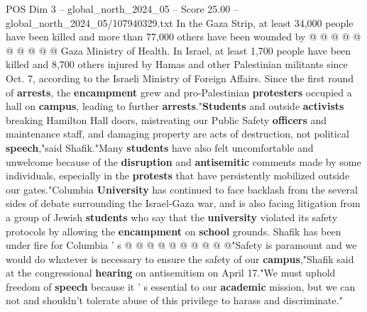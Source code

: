 \begin{textsample}{POS Dim 3 – global\_north\_2024\_05 – Score 25.00 – global\_north\_2024\_05/107940329.txt}
In the Gaza Strip, at least 34,000 people have been killed and more than 77,000 others have been wounded by @ @ @ @ @ @ @ @ @ @ Gaza Ministry of Health.
In Israel, at least 1,700 people have been killed and 8,700 others injured by Hamas and other Palestinian militants since Oct. 7, according to the Israeli Ministry of Foreign Affairs.
Since the first round of \textbf{arrests}, the \textbf{encampment} grew and pro-Palestinian \textbf{protesters} occupied a hall on \textbf{campus}, leading to further \textbf{arrests}."\textbf{Students} and outside \textbf{activists} breaking Hamilton Hall doors, mistreating our Public Safety \textbf{officers} and maintenance staff, and damaging property are acts of destruction, not political \textbf{speech},"said Shafik."Many \textbf{students} have also felt uncomfortable and unwelcome because of the \textbf{disruption} and \textbf{antisemitic} comments made by some individuals, especially in the \textbf{protests} that have persistently mobilized outside our gates."Columbia \textbf{University} has continued to face backlash from the several sides of debate surrounding the Israel-Gaza war, and is also facing litigation from a group of Jewish \textbf{students} who say that the \textbf{university} violated its safety protocols by allowing the \textbf{encampment} on \textbf{school} grounds.
Shafik has been under fire for Columbia ' s @ @ @ @ @ @ @ @ @ @"Safety is paramount and we would do whatever is necessary to ensure the safety of our \textbf{campus},"Shafik said at the congressional \textbf{hearing} on antisemitism on April 17."We must uphold freedom of \textbf{speech} because it ' s essential to our \textbf{academic} mission, but we can not and shouldn't tolerate abuse of this privilege to harass and discriminate."

\end{textsample}
